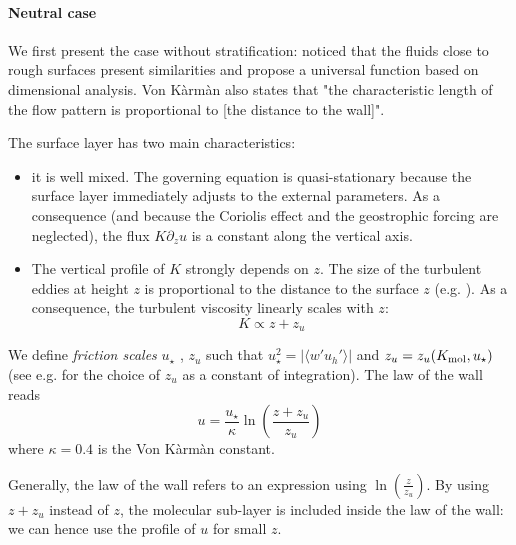 \paragraph{Neutral case}
We first present the case without stratification:
\citep{karman_mechanische_1930} noticed that the
fluids close to rough surfaces present similarities and
propose a universal function based on dimensional analysis.
Von Kàrmàn also states that "the characteristic length
of the flow pattern is proportional to
[the distance to the wall]".
\par
The surface layer has two main characteristics:
\begin{itemize}
	\item it is well mixed. The governing equation
		is quasi-stationary because the surface layer
		immediately adjusts to the external parameters.
		As a consequence (and because the Coriolis effect
		and the geostrophic forcing are neglected),
		the flux $K \partial_z u$
		is a constant along the vertical axis.
	\item The vertical profile of $K$ strongly depends 
		on $z$.
		The size of the turbulent eddies at height $z$
		is proportional to the distance to the surface $z$
		(e.g. \cite{kawai_wall-modeling_2012}).
		As a consequence, the turbulent viscosity
		linearly scales with $z$:
		\begin{equation}
			K \propto z+z_u
		\end{equation}
\end{itemize}
We define \textit{friction scales} $u_\star$
, $z_{u}$ such that $u_\star^2 =
|\langle w' u_h' \rangle|$ and
$z_{u} = z_{u}(K_{\rm mol}, u_\star)$
(see e.g. \citep{schlichting_boundary_1960}
for the choice of $z_{u}$ as a constant
of integration).
The law of the wall reads
\begin{equation}
	\label{eq:airseaSCM_LawOfWallProfile}
	u = \frac{u_\star}{\kappa} \ln(\frac{z+z_u}{z_u})
\end{equation}
where $\kappa = 0.4$ is the Von Kàrmàn constant.
\begin{remark}
	Generally, the law of the wall
	refers to an expression using
	$\ln(\frac{z}{z_u})$. By using $z+z_u$
	instead of $z$,
	the molecular sub-layer is included
	inside the law of the wall: we can hence
	use the profile of $u$ for small $z$.
\end{remark}
